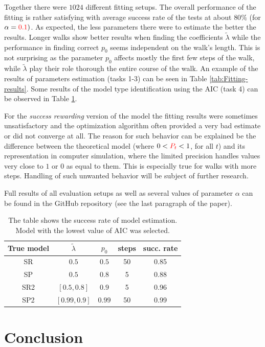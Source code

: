 \documentclass{amsart}
\theoremstyle{definition}
\theoremstyle{plain}
\theoremstyle{plain}
\theoremstyle{plain}
\numberwithin{equation}{section}
\begin{document}
Together there were $1024$ different fitting setups. The overall performance of the fitting is rather satisfying with average success rate of the tests at about $80\%$ (for $\alpha={\color{red}0.1})$. As expected, the less parameters there were to estimate the better the results. Longer walks show better results when finding the coefficients $\tilde{\lambda}$ while the performance in finding correct $p_0$ seems independent on the walk's length. This is not surprising as the parameter $p_0$ affects mostly the first few steps of the walk, while $\tilde{\lambda}$ play their role thorough the entire course of the walk. An example of the results of parameters estimation (tasks 1-3) can be seen in Table \ref{tab:Fitting-results}. Some results of the model type identification using the AIC (task 4) can be observed in Table \ref{tab:Fitting-results-model}. 

For the \emph{success rewarding} version of the model the fitting results were sometimes unsatisfactory and the optimization algorithm often provided a very bad estimate or did not converge at all. The reason for such behavior can be explained be the difference between the theoretical model (where $0<{\color{red}P_t}<1$, {\color{red}for all} $t$) and its representation in computer simulation, where the limited precision handles values very close to $1$ or $0$ as equal to them. This is especially true for walks with more steps. Handling of such unwanted behavior will be subject of further research. 

Full results of all {\color{red}evaluation} setups as well as several values of parameter $\alpha$ can be found in the GitHub repository (see the last paragraph of the paper). 

\begin{table}
\centering{}

{\caption{\label{tab:Fitting-results-model}The table shows the success {\color{red} rate} of model estimation. Model with the lowest value of AIC was selected.}
\begin{tabular}{|c|c|c|c|c|}
\hline
True model & $\tilde{\lambda}$  & $p_0$  & steps & {\color{red}succ. rate} \tabularnewline
\hline
SR & $0.5$  & $0.5$  & 50 & 0.85 \tabularnewline
\hline
SP & $0.5$  & $0.8$  & 5 & 0.88 \tabularnewline
\hline
SR2 & $[0.5,0.8]$  & $0.9$  & 5 & 0.96 \tabularnewline
\hline
SP2 & $[0.99,0.9]$  & $0.99$  & 50 & 0.99 \tabularnewline
\hline
\end{tabular}
}
\end{table}

\section{Conclusion\label{sec:Conclusion}}
\end{document}
